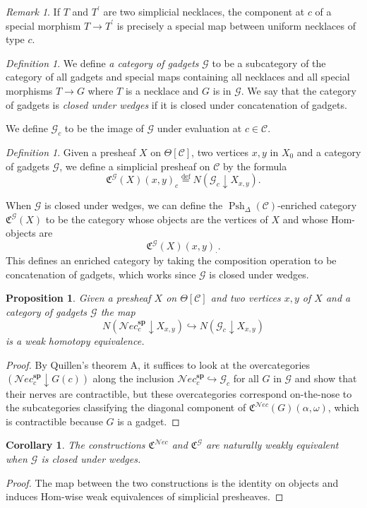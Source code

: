 \documentclass{amsart}
\numberwithin{equation}{section}
\theoremstyle{plain}   %
\newtheorem{prop}[subsection]{Proposition}
\newtheorem{cor}[subsection]{Corollary}
\theoremstyle{remark}
\newtheorem{rem}[subsection]{Remark}
\newtheorem{defn}[subsection]{Definition}
\theoremstyle{plain}
\DeclareMathOperator{\Psh}{Psh}
\newcommand{\Nec}{\ensuremath{{\mathcal{N}ec}}}
\newcommand{\overcat}[2]{{(#1\downarrow #2)}}
\newcommand{\C}{\ensuremath{\mathcal{C}}}
\newcommand{\defeq}{\overset{\mathrm{def}}=}
\begin{document}
\begin{rem}
	If \(T\) and \(T^\prime\) are two simplicial necklaces, the component at \(c\) of a special morphism \(T\to T^\prime\) is precisely a special map between uniform necklaces of type \(c\).
\end{rem}

\begin{defn}
	We define \emph{a category of gadgets} \(\mathcal{G}\) to be a subcategory of the category of all gadgets and special maps containing all necklaces and all special morphisms \(T\to G\) where \(T\) is a necklace and \(G\) is in \(\mathcal{G}\).  We say that the category of gadgets is \emph{closed under wedges} if it is closed under concatenation of gadgets.

	We define \(\mathcal{G}_c\) to be the image of \(\mathcal{G}\) under evaluation at \(c\in \C\).
\end{defn}

\begin{defn}
	Given a presheaf \(X\) on \(\Theta[\C]\), two vertices \(x,y\) in \(X_0\) and a category of gadgets \(\mathcal{G}\), we define a simplicial presheaf on \(\C\) by the formula \[\mathfrak{C}^{\mathcal{G}}(X)(x,y)_c\defeq N\overcat{\mathcal{G}_c}{X_{x,y}}.\]

	When \(\mathcal{G}\) is closed under wedges, we can define the \(\Psh_\Delta(\C)\)-enriched category \(\mathfrak{C}^{\mathcal{G}}(X)\) to be the category whose objects are the vertices of \(X\) and whose Hom-objects are
	\[\mathfrak{C}^{\mathcal{G}}(X)(x,y)_\cdot.\]
	This defines an enriched category by taking the composition operation to be concatenation of gadgets, which works since \(\mathcal{G}\) is closed under wedges.
\end{defn}
\begin{prop}\label{gadgetlemma}
	Given a presheaf \(X\) on \(\Theta[\C]\) and two vertices \(x,y\) of \(X\) and a category of gadgets \(\mathcal{G}\) the map \[N\overcat{\Nec^\mathbf{sp}_c}{X_{x,y}} \hookrightarrow N\overcat{\mathcal{G}_c}{X_{x,y}}\] is a weak homotopy equivalence.
\end{prop}
\begin{proof}
	By Quillen's theorem A, it suffices to look at the overcategories \(\overcat{\Nec^\mathbf{sp}_c}{G(c)}\) along the inclusion \(\Nec^\mathbf{sp}_c\hookrightarrow \mathcal{G}_c\) for all \(G\) in \(\mathcal{G}\) and show that their nerves are contractible, but these overcategories correspond on-the-nose to the subcategories classifying the diagonal component of \(\mathfrak{C}^\Nec(G)(\alpha,\omega)\), which is contractible because \(G\) is a gadget.
\end{proof}
\begin{cor}
	The constructions \(\mathfrak{C}^\Nec\) and \(\mathfrak{C}^\mathcal{G}\) are naturally weakly equivalent when \(\mathcal{G}\) is closed under wedges.
\end{cor}
\begin{proof}
	The map between the two constructions is the identity on objects and induces Hom-wise weak equivalences of simplicial presheaves.
\end{proof}
\end{document}
